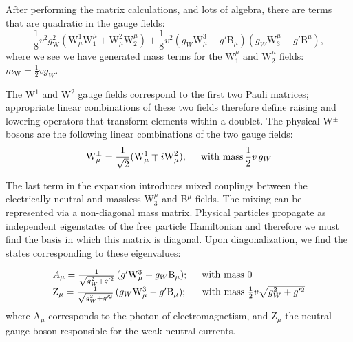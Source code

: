 After performing the matrix calculations, and lots of algebra, there are terms that are quadratic in the gauge fields:
\begin{equation}
\frac{1}{8} v^{2} g_{\mathrm{W}}^{2} ( \mathrm{W}^{1}_{\mu} \mathrm{W}_{1}^{\mu} + \mathrm{W}^{2}_{\mu} \mathrm{W}_{2}^{\mu}) + \frac{1}{8} v^{2} ( g_{W} \mathrm{W}^{3}_{\mu} - g'\mathrm{B}_{\mu} ) ( g_{W} \mathrm{W}_{3}^{\mu} -g' \mathrm{B}^{\mu} ),
\end{equation}
where we see we have generated mass terms for the W$^{\mu}_{1}$ and W$^{\mu}_{2}$ fields:  $m_{\mathrm{W}} = \frac{1}{2} v g_{W}$. 

The W$^{1}$ and W$^{2}$ gauge fields correspond to the first two Pauli matrices; appropriate linear combinations of these two fields therefore define raising and lowering operators that transform elements within a doublet. The physical W$^{\pm}$ bosons are the following linear combinations of the two gauge fields:
\begin{equation}
\mathrm{W}_{\mu}^{\pm} = \frac{1}{\sqrt{2}} ( \mathrm{W}^{1}_{\mu} \mp i\mathrm{W}_{\mu}^{2}) ;\hspace{0.5cm} \mathrm{with\,\,mass}\, \frac{1}{2} v\,g_{W}
\end{equation}

The last term in the expansion introduces mixed couplings between the electrically neutral and massless W$_{3}^{\mu}$ and B$^{\mu}$ fields. The mixing can be represented via a non-diagonal mass matrix. Physical particles propagate as independent eigenstates of the free particle Hamiltonian and therefore we must find the basis in which this matrix is diagonal. Upon diagonalization, we find the states corresponding to these eigenvalues:

\begin{equation}
\begin{array}{l}
A_{\mu} = \frac{1}{\sqrt{g_{W}^{2} + g'^{2}}} \, (g' \mathrm{W}^{3}_{\mu} + g_{W}\mathrm{B}_{\mu});\hspace{0.5cm} \mathrm{with\,\,mass}\,\,0\\
\mathrm{Z}_{\mu} = \frac{1}{\sqrt{g_{W}^{2} + g'^{2}}} \, (g_{W} \mathrm{W}^{3}_{\mu} - g'\mathrm{B}_{\mu}); \hspace{0.56cm} \mathrm{with\,\,mass}\,\, \frac{1}{2}v\sqrt{g_{W}^{2} + g'^{2}}
\end{array}
\end{equation}
where $\mathrm{A}_{\mu}$ corresponds to the photon of electromagnetism, and Z$_{\mu}$ the neutral gauge boson responsible for the weak neutral currents.

